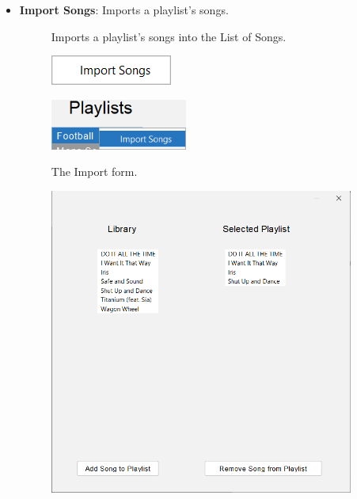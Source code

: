 \documentclass{article}
\begin{document}
\begin{itemize}
        \item \textbf{Import Songs}: Imports a playlist's songs.
    \begin{description}
        \item[] Imports a playlist's songs into the List of Songs.
        \item[] \includegraphics[width=4cm]{Images/popup_rightClick_Import.png}
        \item[] \includegraphics[width=4.5cm]{Images/popup_rightClick_ImportSelected.png}
        \item[] The Import form. 
        \item[] \includegraphics[width=10cm]{Images/importPopupForm.png}
    \end{description}

    \clearpage
    

\end{itemize}
\end{document}
